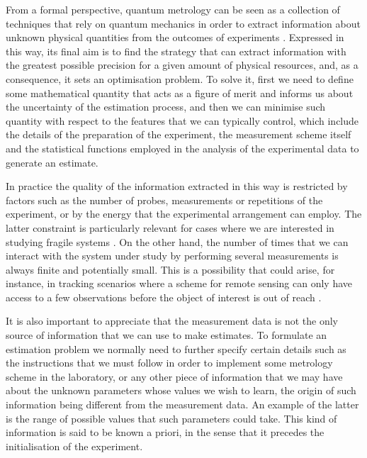 From a formal perspective, quantum metrology can be seen as a collection of techniques that rely on quantum mechanics in order to extract information about unknown physical quantities from the outcomes of experiments \cite{giovanetti2006review, dunningham2006, paris2009, rafal2015}. Expressed in this way, its final aim is to find the strategy that can extract information with the greatest possible precision for a given amount of physical resources, and, as a consequence, it sets an optimisation problem. To solve it, first we need to define some mathematical quantity that acts as a figure of merit and informs us about the uncertainty of the estimation process, and then we can minimise such quantity with respect to the features that we can typically control, which include the details of the preparation of the experiment, the measurement scheme itself and the statistical functions employed in the analysis of the experimental data to generate an estimate. 

In practice the quality of the information extracted in this way is restricted by factors such as the number of probes, measurements or repetitions of the experiment, or by the energy that the experimental arrangement can employ. The latter constraint is particularly relevant for cases where we are interested in studying fragile systems \cite{eckert2007, pototschnig2011, carlton2010, taylor2013, taylor2015, taylor2016, PaulProctor2016}. On the other hand, the number of times that we can interact with the system under study by performing several measurements is always finite and potentially small. This is a possibility that could arise, for instance, in tracking scenarios where a scheme for remote sensing can only have access to a few observations before the object of interest is out of reach \cite{shabir2015, kebei2013, lanzagorta2012,wang2016,zhuang2017}.

It is also important to appreciate that the measurement data is not the only source of information that we can use to make estimates. To formulate an estimation problem we normally need to further specify certain details such as the instructions that we must follow in order to implement some metrology scheme in the laboratory, or any other piece of information that we may have about the unknown parameters whose values we wish to learn, the origin of such information being different from the measurement data. An example of the latter is the range of possible values that such parameters could take. This kind of information is said to be known a priori, in the sense that it precedes the initialisation of the experiment.

